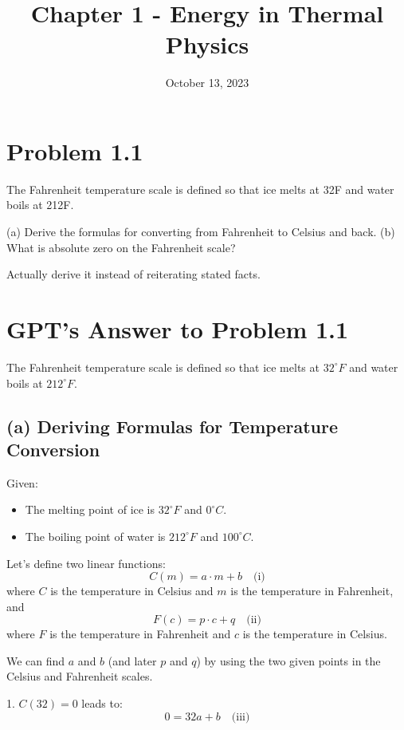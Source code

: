 \documentclass[12pt]{article}
\title{Chapter 1 - Energy in Thermal Physics}
\date{October 13, 2023}
\begin{document}
\maketitle
\section*{Problem 1.1}

The Fahrenheit temperature scale is defined so that ice melts at
32F and water boils at 212F.

(a) Derive the formulas for converting from Fahrenheit to Celsius and back.
(b) What is absolute zero on the Fahrenheit scale?

Actually derive it instead of reiterating stated facts.

\section*{GPT's Answer to Problem 1.1}

The Fahrenheit temperature scale is defined so that ice melts at \(32^\circ F\) and water boils at \(212^\circ F\).

\subsection*{(a) Deriving Formulas for Temperature Conversion}

Given: 
\begin{itemize}
    \item The melting point of ice is \(32^\circ F\) and \(0^\circ C\).
    \item The boiling point of water is \(212^\circ F\) and \(100^\circ C\).
\end{itemize}

Let's define two linear functions:
\begin{equation}
    C(m) = a \cdot m + b \quad \text{(i)}
\end{equation}
where \(C\) is the temperature in Celsius and \(m\) is the temperature in Fahrenheit, and
\begin{equation}
    F(c) = p \cdot c + q \quad \text{(ii)}
\end{equation}
where \(F\) is the temperature in Fahrenheit and \(c\) is the temperature in Celsius.

We can find \(a\) and \(b\) (and later \(p\) and \(q\)) by using the two given points in the Celsius and Fahrenheit scales.

1. \(C(32) = 0\) leads to:
\begin{equation}
    0 = 32a + b \quad \text{(iii)}
\end{equation}
\end{document}
